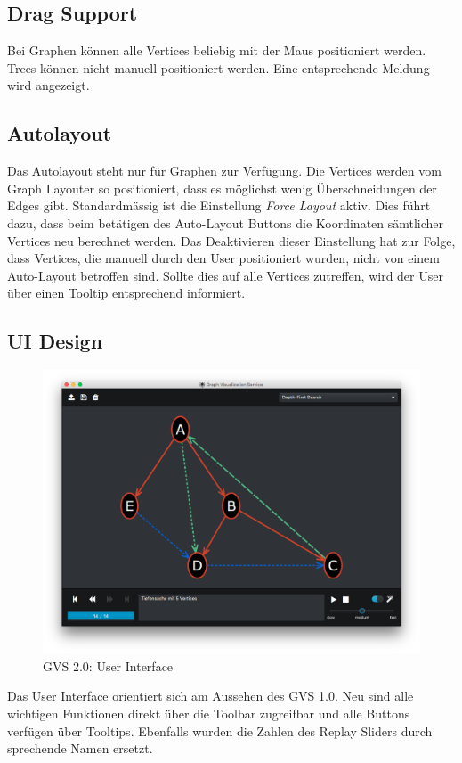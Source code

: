 \documentclass[11pt,a4paper,english,oneside]{book}
\numberwithin{equation}{chapter}
\begin{document}
	\subsection{Drag Support}
	Bei Graphen können alle Vertices beliebig mit der Maus positioniert werden. Trees können nicht manuell positioniert werden. Eine entsprechende Meldung wird angezeigt.
		
	\subsection{Autolayout}
	Das Autolayout steht nur für Graphen zur Verfügung. Die Vertices werden vom Graph Layouter so positioniert, dass es möglichst wenig Überschneidungen der Edges gibt. Standardmässig ist die Einstellung \textit{Force Layout} aktiv. Dies führt dazu, dass beim betätigen des Auto-Layout Buttons die Koordinaten sämtlicher Vertices neu berechnet werden. Das Deaktivieren dieser Einstellung hat zur Folge, dass Vertices, die manuell durch den User positioniert wurden, nicht von einem Auto-Layout betroffen sind. Sollte dies auf alle Vertices zutreffen, wird der User über einen Tooltip entsprechend informiert.
		
	\subsection{UI Design}
	\begin{figure}[h!]
		\centering
		\includegraphics[width=0.7\linewidth]{assets/images/gvs-ui-graph}
		\caption{GVS 2.0: User Interface}
		\label{fig:gvs-ui-graph}
	\end{figure}

	Das User Interface orientiert sich am Aussehen des GVS 1.0. Neu sind alle wichtigen Funktionen direkt über die Toolbar zugreifbar und alle Buttons verfügen über Tooltips. Ebenfalls wurden die Zahlen des Replay Sliders durch sprechende Namen ersetzt.
	
\end{document}
